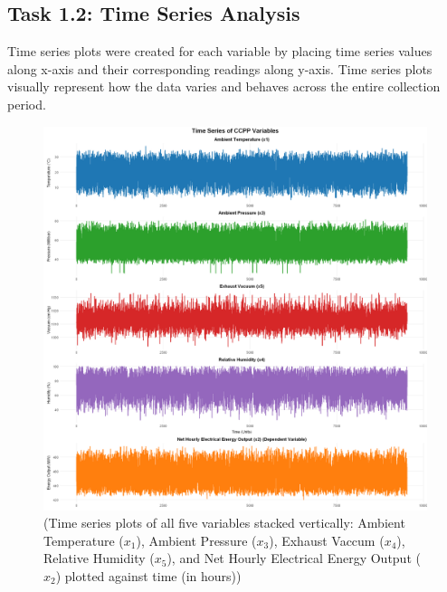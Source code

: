 \documentclass[12pt,a4paper]{article}
\begin{document}

\subsection*{Task 1.2: Time Series Analysis}

Time series plots were created for each variable by placing time series values
along x-axis and their corresponding readings along y-axis. 
Time series plots visually represent how the data varies and behaves across 
the entire collection period. %

\begin{figure}[H]
    \centering
    \includegraphics[width=\textwidth]{z3.png}
    \caption{(Time series plots of all five variables stacked 
    vertically: Ambient Temperature (\(x_1\)), Ambient Pressure  
    (\(x_3\)), Exhaust Vaccum (\(x_4\)), Relative Humidity (\(x_5\)), 
    and Net Hourly Electrical Energy Output (\(x_2\)) plotted against time (in hours))}
    \label{fig:time_series}
\end{figure}
\end{document}

